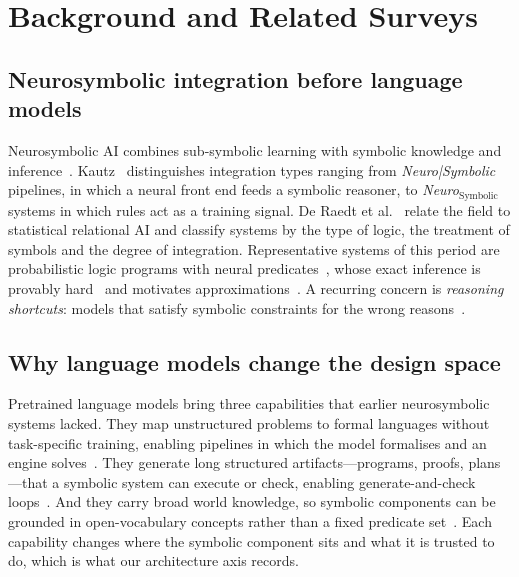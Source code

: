 \section{Background and Related Surveys}
\label{sec:background}

\subsection{Neurosymbolic integration before language models}
Neurosymbolic AI combines sub-symbolic learning with symbolic knowledge and inference~\cite{garcez2023neurosymbolic}. Kautz~\cite{kautz2022third} distinguishes integration types ranging from \emph{Neuro|Symbolic} pipelines, in which a neural front end feeds a symbolic reasoner, to \emph{Neuro$_\text{Symbolic}$} systems in which rules act as a training signal. De Raedt et al.~\cite{deraedt2020statistical} relate the field to statistical relational AI and classify systems by the type of logic, the treatment of symbols and the degree of integration. Representative systems of this period are probabilistic logic programs with neural predicates~\cite{manhaeve2018deepproblog,yang2020neurasp,huang2021scallop}, whose exact inference is provably hard~\cite{maene2024hardness} and motivates approximations~\cite{vankrieken2023nesi}. A recurring concern is \emph{reasoning shortcuts}: models that satisfy symbolic constraints for the wrong reasons~\cite{marconato2023neuro,yang2024analysis}.

\subsection{Why language models change the design space}
Pretrained language models bring three capabilities that earlier neurosymbolic systems lacked. They map unstructured problems to formal languages without task-specific training, enabling pipelines in which the model formalises and an engine solves~\cite{olausson2023linc,ye2023satlm,pan2023logiclm}. They generate long structured artifacts---programs, proofs, plans---that a symbolic system can execute or check, enabling generate-and-check loops~\cite{polu2020generative,jiang2023draft}. And they carry broad world knowledge, so symbolic components can be grounded in open-vocabulary concepts rather than a fixed predicate set~\cite{gupta2023visprog,suris2023vipergpt}. Each capability changes where the symbolic component sits and what it is trusted to do, which is what our architecture axis records.


